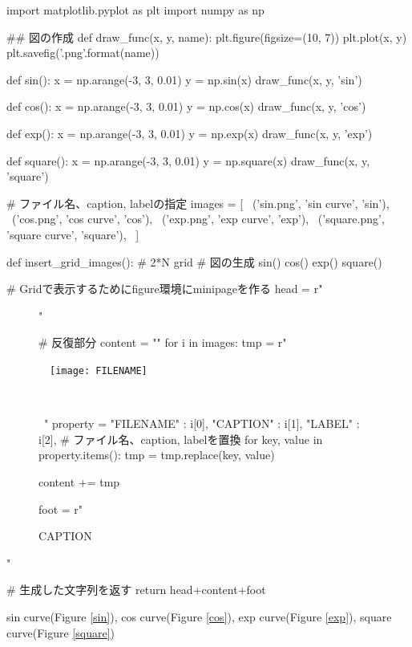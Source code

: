 \documentclass{article}
\begin{document}
\begin{pycode}
import matplotlib.pyplot as plt
import numpy as np

## 図の作成
def draw_func(x, y, name):
  plt.figure(figsize=(10, 7))
  plt.plot(x, y)
  plt.savefig('{}.png'.format(name))

def sin():
  x = np.arange(-3, 3, 0.01)
  y = np.sin(x)
  draw_func(x, y, 'sin')
  
def cos():
  x = np.arange(-3, 3, 0.01)
  y = np.cos(x)
  draw_func(x, y, 'cos')

def exp():
  x = np.arange(-3, 3, 0.01)
  y = np.exp(x)
  draw_func(x, y, 'exp')

def square():
  x = np.arange(-3, 3, 0.01)
  y = np.square(x)
  draw_func(x, y, 'square')

  # ファイル名、caption, labelの指定
images = [ \
  ('sin.png', 'sin curve', 'sin'), \
  ('cos.png', 'cos curve', 'cos'), \
  ('exp.png', 'exp curve', 'exp'), \
  ('square.png', 'square curve', 'square'), \
  ]

def insert_grid_images(): # 2*N grid
  # 図の生成
  sin()
  cos()
  exp()
  square()

  # Gridで表示するためにfigure環境にminipageを作る
  head = r"\begin{figure}[ht]"
  
  # 反復部分
  content = ""
  for i in images:
    tmp = r"\
    \begin{minipage}[ht]{0.48\textwidth} \
      \centering \
      \texttt{[image: FILENAME]} \
      \caption{CAPTION} \
      \label{LABEL} \
    \end{minipage} \
    \hfill"
    property = {
      "FILENAME" : i[0],
      "CAPTION" : i[1],
      "LABEL" : i[2],  
    }
    # ファイル名、caption, labelを置換
    for key, value in property.items():
      tmp = tmp.replace(key, value)

    content += tmp

  foot = r"\end{figure}"

  # 生成した文字列を返す
  return head+content+foot
\end{pycode}  


sin curve(Figure \ref{sin}), %
cos curve(Figure \ref{cos}), 
exp curve(Figure \ref{exp}), 
square curve(Figure \ref{square})

\end{document}
